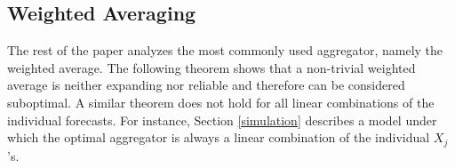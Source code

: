 \documentclass[11pt]{article}
\theoremstyle{definition}
\theoremstyle{definition}
\begin{document}

%

\subsection{Weighted Averaging} \label{contraction}

The rest of the paper analyzes the most commonly used aggregator, namely the weighted average. The following theorem shows that a non-trivial weighted average is neither expanding nor reliable and therefore can be considered suboptimal. A similar theorem does not hold for all linear combinations of the individual forecasts. For instance, Section \ref{simulation} describes a model under which the optimal aggregator is always a linear combination of the individual $X_j$'s.
\end{document}
